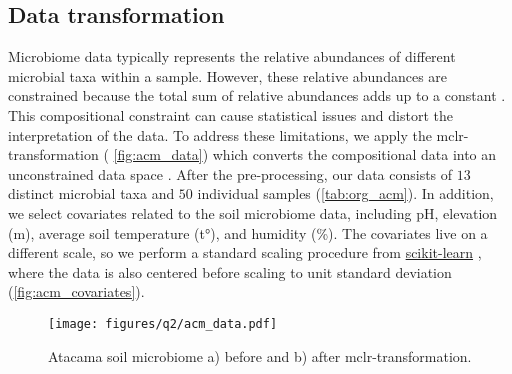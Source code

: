 \documentclass[10pt,a4paper]{article}
\let\cite\citep
\begin{document}
\subsection*{Data transformation}
Microbiome data typically represents the relative abundances of different microbial taxa within a sample. However, these relative abundances are constrained because the total sum of relative abundances adds up to a constant \cite{gloor2017microbiome}. This compositional constraint can cause statistical issues and distort the interpretation of the data. To address these limitations, we apply the mclr-transformation (  \autoref{fig:acm_data}) which converts the compositional data into an unconstrained data space \cite{yoon2019microbial}. After the pre-processing, our data consists of $13$ distinct microbial taxa and $50$ individual samples (\autoref{tab:org_acm}). In addition, we select covariates related to the soil microbiome data, including pH, elevation (m), average soil temperature (t°), and humidity (\%). The covariates live on a different scale, so we perform a standard scaling procedure from \href{https://scikit-learn.org/stable/modules/generated/sklearn.preprocessing.StandardScaler.html}{scikit-learn} \cite{scikit-learn}, where the data is also centered before scaling to unit standard deviation (\autoref{fig:acm_covariates}). 



\begin{figure}[h]
    \centering
    \texttt{[image: figures/q2/acm\_data.pdf]}
    \caption{Atacama soil microbiome a) before and b) after mclr-transformation.}
    \label{fig:acm_data}
\end{figure}
\end{document}
